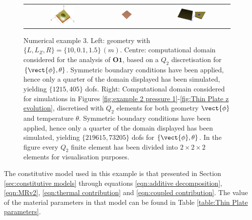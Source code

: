 \begin{figure}[hbtp!]
	\centering
	\begin{tabular}{ccc}
	\includegraphics[width=0.33\textwidth]{Figures/Example2/ThinPlate.pdf}&
	\includegraphics[width=0.23\textwidth]{Figures/Example2/MeshForStudy}&
	\includegraphics[width=0.40\textwidth]{Figures/Example2/TheMeshandDetail.pdf}
	\end{tabular}
	\caption{Numerical example 3. Left: geometry with $\{L,L_Z,R\}=\{10,0.1,1.5\}\,(m)$. Centre: computational domain considered for the analysis of $\textbf{O1}$, based on a  $Q_2$ discretisation for $\{\vect{\phi},\theta\}$. Symmetric boundary conditions have been applied, hence only a quarter of the domain displayed has been simulated, yielding $\{1215,405\}$ dofs. Right: Computational domain considered for simulations in Figures \ref{fig:example 2 pressure 1}-\ref{fig:Thin Plate z evolution}, discretised with $Q_2$ elements for both geometry $\vect{\phi}$ and temperature $\theta$. Symmetric boundary conditions have been applied, hence only a quarter of the domain displayed has been simulated, yielding $\{219615,73205\}$ dofs  for $\{\vect{\phi},\theta\}$. In the figure every $Q_2$ finite element has been divided into $2\times 2\times 2$ elements for visualisation purposes.}
	\label{fig:Thin Plate Geometry}
\end{figure}
%

The constitutive model used in this example is that presented in Section \ref{sec:constitutive models} through equations \eqref{eqn:additive decomposition}, \eqref{eqn:MRv2}, \eqref{eqn:thermal contribution} and \eqref{eqn:coupled contribution}. The value of the material parameters in that model can be found in Table \ref{table:Thin Plate parameters}.

